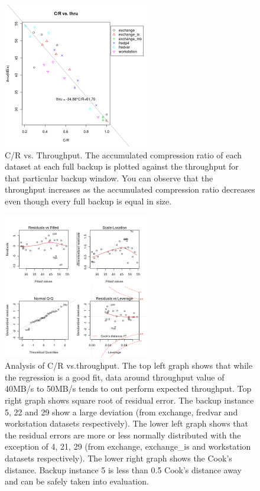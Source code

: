\begin{figure}[!t]
\centering
\includegraphics[width=2.5in]{figure/dedup/full018}
\caption{C/R vs. Throughput. The accumulated compression ratio of each dataset at each full backup is plotted against the throughput for that particular backup window. You can observe that the throughput increases as the accumulated compression ratio decreases even though every full backup is equal in size.}
\label{compthru}
\end{figure}

\begin{figure}[!t]
\centering
\includegraphics[width=2.5in]{figure/dedup/full019}
\caption{Analysis of C/R vs.throughput. The top left graph shows that while the regression is a good fit, data around throughput value of 40MB/s to 50MB/s tends to out perform expected throughput. Top right graph shows square root of residual error. The backup instance 5, 22 and 29 show a large deviation (from exchange, fredvar and workstation datasets respectively). The lower left graph shows that the residual errors are more or less normally distributed with the exception of 4, 21, 29 (from exchange, exchange\_is and workstation datasets respectively). The lower right graph shows the Cook's distance. Backup instance 5 is less than 0.5 Cook's distance away and can be safely taken into evaluation.} 
\label{anal}
\end{figure}

